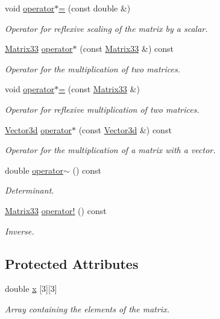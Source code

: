 \begin{DoxyCompactItemize}
$$void \hyperlink{classMatrix33_a83162791813bef030b1ceb5df3c5cae3}{operator$\ast$=} (const double \&)
\begin{DoxyCompactList}\small\item\em Operator for reflexive scaling of the matrix by a scalar. \end{DoxyCompactList}\item 
\hyperlink{classMatrix33}{Matrix33} \hyperlink{classMatrix33_a525f14614255ff81c0cbab8060e8e065}{operator$\ast$} (const \hyperlink{classMatrix33}{Matrix33} \&) const 
\begin{DoxyCompactList}\small\item\em Operator for the multiplication of two matrices. \end{DoxyCompactList}\item 
void \hyperlink{classMatrix33_ac3937bdeb034cc83b4adcad16cd58a26}{operator$\ast$=} (const \hyperlink{classMatrix33}{Matrix33} \&)
\begin{DoxyCompactList}\small\item\em Operator for reflexive multiplication of two matrices. \end{DoxyCompactList}\item 
\hyperlink{classVector3d}{Vector3d} \hyperlink{classMatrix33_a601584a1edbaae7c6a2a2874605d6f61}{operator$\ast$} (const \hyperlink{classVector3d}{Vector3d} \&) const 
\begin{DoxyCompactList}\small\item\em Operator for the multiplication of a matrix with a vector. \end{DoxyCompactList}\item 
double \hyperlink{classMatrix33_a15b37caa6ab0d9f4a9f0d95846abd675}{operator$\sim$} () const 
\begin{DoxyCompactList}\small\item\em Determinant. \end{DoxyCompactList}\item 
\hyperlink{classMatrix33}{Matrix33} \hyperlink{classMatrix33_a1b822a20343a26b3c9bb7fd5c1247f37}{operator!} () const 
\begin{DoxyCompactList}\small\item\em Inverse. \end{DoxyCompactList}\end{DoxyCompactItemize}
\subsection*{Protected Attributes}
\begin{DoxyCompactItemize}
\item 
double \hyperlink{classMatrix33_af7f01fa466616eb7c8eda2e4d9f85cdd}{x} \mbox{[}3\mbox{]}\mbox{[}3\mbox{]}
\begin{DoxyCompactList}\small\item\em Array containing the elements of the matrix. \end{DoxyCompactList}\end{DoxyCompactItemize}


